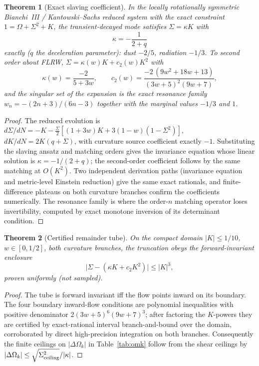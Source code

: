 \documentclass[10pt]{article}
\newtheorem{theorem}{Theorem}[section]
\theoremstyle{definition}
\newcommand{\dOk}{\Delta\Omega_{k}}
\begin{document}
\begin{theorem}[Exact slaving coefficient]
\label{thm:slaving}
In the locally rotationally symmetric Bianchi~III / Kantowski--Sachs
reduced system with the exact constraint $1 = \Omega + \Sigma^2 + K$,
the transient-decayed mode satisfies $\Sigma = \kappa K$ with
\begin{equation}
\kappa = -\frac{1}{2+q}
\end{equation}
exactly ($q$ the deceleration parameter): dust $-2/5$, radiation
$-1/3$. To second order about FLRW,
$\Sigma = \kappa(w) K + c_2(w) K^2$ with
\begin{equation}
\kappa(w) = \frac{-2}{5+3w}, \qquad
c_2(w) = \frac{-2\,(9w^2 + 18w + 13)}{(3w+5)^2 (9w+7)},
\end{equation}
and the singular set of the expansion is the exact resonance family
$w_n = -(2n+3)/(6n-3)$ together with the marginal values $-1/3$ and
$1$.
\end{theorem}
\begin{proof}
The reduced evolution is
$d\Sigma/dN = -K - \tfrac{\Sigma}{2}[(1+3w)K + 3(1-w)(1-\Sigma^2)]$,
$dK/dN = 2K(q+\Sigma)$, with curvature source coefficient exactly
$-1$. Substituting the slaving ansatz and matching orders gives the
invariance equation whose linear solution is $\kappa = -1/(2+q)$;
the second-order coefficient follows by the same matching at
$O(K^2)$. Two independent derivation paths (invariance equation and
metric-level Einstein reduction) give the same exact rationals, and
finite-difference plateaus on both curvature branches confirm the
coefficients numerically. The resonance family is where the
order-$n$ matching operator loses invertibility, computed by exact
monotone inversion of its determinant condition.
\end{proof}

\begin{theorem}[Certified remainder tube]
\label{thm:remainder}
On the compact domain $|K| \le 1/10$, $w \in [0, 1/2]$, both curvature
branches, the truncation obeys the forward-invariant enclosure
\begin{equation}
\bigl|\Sigma - (\kappa K + c_2 K^2)\bigr| \le |K|^3 ,
\end{equation}
proven uniformly (not sampled).
\end{theorem}
\begin{proof}
The tube is forward invariant iff the flow points inward on its
boundary. The four boundary inward-flow conditions are polynomial
inequalities with positive denominator $2(3w+5)^6(9w+7)^3$; after
factoring the $K$-powers they are certified by exact-rational interval
branch-and-bound over the domain, corroborated by direct
high-precision integration on both branches. Consequently the finite
ceilings on $|\dOk|$ in Table~\ref{tab:omk} follow from the shear
ceilings by $|\dOk| \le \sqrt{\Sigma^2_{\rm ceiling}}/|\kappa|$.
\end{proof}
\end{document}
